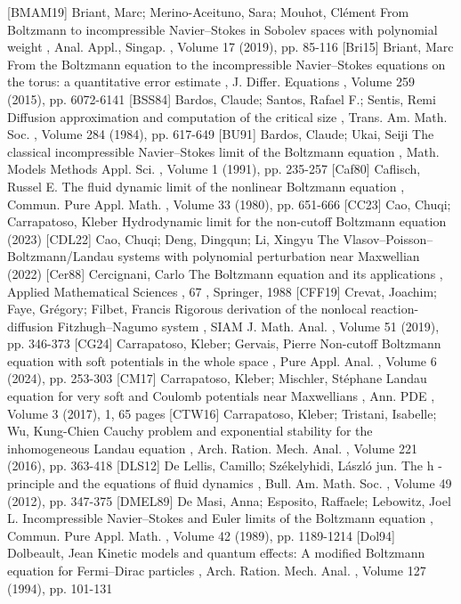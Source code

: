  [BMAM19] Briant, Marc; Merino-Aceituno, Sara; Mouhot, Clément From Boltzmann to incompressible Navier–Stokes in Sobolev spaces with polynomial weight , Anal. Appl., Singap. , Volume 17 (2019), pp. 85-116
 [Bri15] Briant, Marc From the Boltzmann equation to the incompressible Navier–Stokes equations on the torus: a quantitative error estimate , J. Differ. Equations , Volume 259 (2015), pp. 6072-6141
 [BSS84] Bardos, Claude; Santos, Rafael F.; Sentis, Remi Diffusion approximation and computation of the critical size , Trans. Am. Math. Soc. , Volume 284 (1984), pp. 617-649
 [BU91] Bardos, Claude; Ukai, Seiji The classical incompressible Navier–Stokes limit of the Boltzmann equation , Math. Models Methods Appl. Sci. , Volume 1 (1991), pp. 235-257
 [Caf80] Caflisch, Russel E. The fluid dynamic limit of the nonlinear Boltzmann equation , Commun. Pure Appl. Math. , Volume 33 (1980), pp. 651-666
 [CC23] Cao, Chuqi; Carrapatoso, Kleber Hydrodynamic limit for the non-cutoff Boltzmann equation (2023)
 [CDL22] Cao, Chuqi; Deng, Dingqun; Li, Xingyu The Vlasov–Poisson–Boltzmann/Landau systems with polynomial perturbation near Maxwellian (2022)
 [Cer88] Cercignani, Carlo The Boltzmann equation and its applications , Applied Mathematical Sciences , 67 , Springer, 1988
 [CFF19] Crevat, Joachim; Faye, Grégory; Filbet, Francis Rigorous derivation of the nonlocal reaction-diffusion Fitzhugh–Nagumo system , SIAM J. Math. Anal. , Volume 51 (2019), pp. 346-373
 [CG24] Carrapatoso, Kleber; Gervais, Pierre Non-cutoff Boltzmann equation with soft potentials in the whole space , Pure Appl. Anal. , Volume 6 (2024), pp. 253-303
 [CM17] Carrapatoso, Kleber; Mischler, Stéphane Landau equation for very soft and Coulomb potentials near Maxwellians , Ann. PDE , Volume 3 (2017), 1, 65 pages
 [CTW16] Carrapatoso, Kleber; Tristani, Isabelle; Wu, Kung-Chien Cauchy problem and exponential stability for the inhomogeneous Landau equation , Arch. Ration. Mech. Anal. , Volume 221 (2016), pp. 363-418
 [DLS12] De Lellis, Camillo; Székelyhidi, László jun. The h -principle and the equations of fluid dynamics , Bull. Am. Math. Soc. , Volume 49 (2012), pp. 347-375
 [DMEL89] De Masi, Anna; Esposito, Raffaele; Lebowitz, Joel L. Incompressible Navier–Stokes and Euler limits of the Boltzmann equation , Commun. Pure Appl. Math. , Volume 42 (1989), pp. 1189-1214
 [Dol94] Dolbeault, Jean Kinetic models and quantum effects: A modified Boltzmann equation for Fermi–Dirac particles , Arch. Ration. Mech. Anal. , Volume 127 (1994), pp. 101-131
